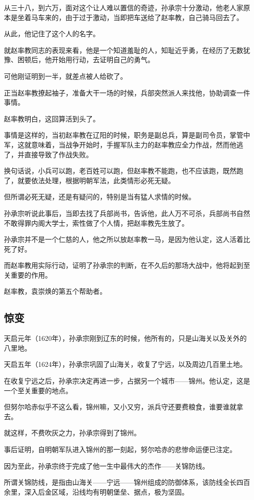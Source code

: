 \begin{multicols}{\theparacolNo}
从三十八，到六万，面对这个让人难以置信的奇迹，孙承宗十分激动，他老人家原本是坐着马车来的，由于过于激动，当即把车送给了赵率教，自己骑马回去了。

从此，他记住了这个人的名字。

就赵率教同志的表现来看，他是一个知道羞耻的人，知耻近乎勇，在经历了无数犹豫、困顿后，他开始用行动，去证明自己的勇气。

可他刚证明到一半，就差点被人给砍了。

正当赵率教撩起袖子，准备大干一场的时候，兵部突然派人来找他，协助调查一件事情。

赵率教明白，这回算活到头了。

事情是这样的，当初赵率教在辽阳的时候，职务是副总兵，算是副司令员，掌管中军，这就意味着，当战争开始时，手握军队主力的赵率教应全力作战，然而他逃了，并直接导致了作战失败。

换句话说，小兵可以跑，老百姓可以跑，但赵率教不能跑，也不应该跑，既然跑了，就要依法处理，根据明朝军法，此类情形必死无疑。

但所谓必死无疑，还是有疑问的，特别是当有猛人求情的时候。

孙承宗听说此事后，当即去找了兵部尚书，告诉他，此人万不可杀，兵部尚书自然不敢得罪内阁大学士，索性做了个人情，把赵率教先生放了。

孙承宗并不是一个仁慈的人，他之所以放赵率教一马，是因为他认定，这人活着比死了好。

而赵率教用实际行动，证明了孙承宗的判断，在不久后的那场大战中，他将起到至关重要的作用。

赵率教，袁崇焕的第五个帮助者。

\subsection{惊变}
天启元年（1620年），孙承宗刚到辽东的时候，他所有的，只是山海关以及关外的八里地。

天启五年（1624年），孙承宗巩固了山海关，收复了宁远，以及周边几百里土地。

在收复宁远之后，孙承宗决定再进一步，占据另一个城市——锦州。他认定，这是一个至关重要的地点。

但努尔哈赤似乎不这么看，锦州嘛，又小又穷，派兵守还要费粮食，谁要谁就拿去。

就这样，不费吹灰之力，孙承宗得到了锦州。

事后证明，自明朝军队进入锦州的那一刻起，努尔哈赤的悲惨命运便已注定。

因为至此，孙承宗终于完成了他一生中最伟大的杰作——关锦防线。

所谓关锦防线，是指由山海关——宁远——锦州组成的防御体系，该防线全长四百余里，深入后金区域，沿线均有明朝堡垒、据点，极为坚固。


\end{multicols}
